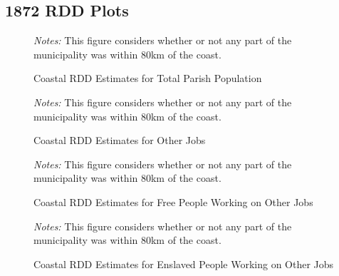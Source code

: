 \documentclass{article}
\begin{document}
\clearpage

\subsection*{1872 RDD Plots}

\begin{figure}[h!]
  \caption{Coastal RDD Estimates for Total Parish Population}
  \begin{center}
  \textit{Notes:} This figure considers whether or not any part of the municipality was within 80km of the coast.
  \end{center}
  \label{fig:1872_RDD_Population}
\end{figure}

\begin{figure}
  \caption{Coastal RDD Estimates for Other Jobs}
  \begin{center}
  \textit{Notes:} This figure considers whether or not any part of the municipality was within 80km of the coast.
  \end{center}
  \label{fig:1872_RDD_OtherJobs}
\end{figure}

\begin{figure}
  \caption{Coastal RDD Estimates for Free People Working on Other Jobs}
  \begin{center}
  \textit{Notes:} This figure considers whether or not any part of the municipality was within 80km of the coast.
  \end{center}
  \label{fig:1872_RDD_Free_OtherJobs}
\end{figure}

\begin{figure}
  \caption{Coastal RDD Estimates for Enslaved People Working on Other Jobs}
  \begin{center}
  \textit{Notes:} This figure considers whether or not any part of the municipality was within 80km of the coast.
  \end{center}
  \label{fig:1872_RDD_Enslaved_OtherJobs}
\end{figure}
\end{document}
